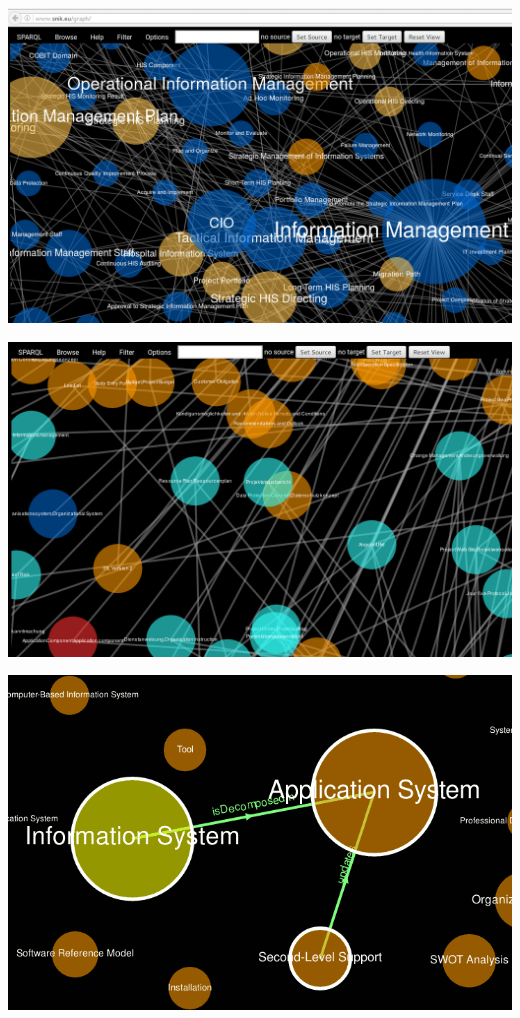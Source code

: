 \documentclass[14pt,aspectratio=1610]{beamer}
\begin{document}
\begin{frame}{}
\centering\includegraphics[width=1.05\textwidth,height=1.05\textheight,keepaspectratio]{img/browser.png}
\end{frame}

\begin{frame}{}
\centering\includegraphics[width=1.05\textwidth,height=1.05\textheight,keepaspectratio]{img/pbrowser.png}
\end{frame}

\begin{frame}{}
\centering\includegraphics[width=1.05\textwidth,height=1.05\textheight,keepaspectratio]{img/shortestpath.png}
\end{frame}
\end{document}
